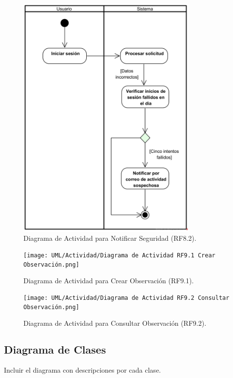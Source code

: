 \begin{figure}[H]
	\centering
		\caption{Diagrama de Actividad para Notificar Seguridad (RF8.2).}
	\includegraphics[width=0.8\textwidth]{UML/Actividad/Diagrama de Actividad RF8.2 Notificar Seguridad.png}
\end{figure}


\begin{figure}[H]
	\centering
	\caption{Diagrama de Actividad para Crear Observación (RF9.1).}
 \texttt{[image: UML/Actividad/Diagrama de Actividad RF9.1 Crear Observación.png]}
\end{figure}


\begin{figure}[H]
	\centering
		\caption{Diagrama de Actividad para Consultar Observación (RF9.2).}
	\texttt{[image: UML/Actividad/Diagrama de Actividad RF9.2 Consultar Observación.png]}
\end{figure}


\subsection{Diagrama de Clases}
Incluir el diagrama con descripciones por cada clase.

